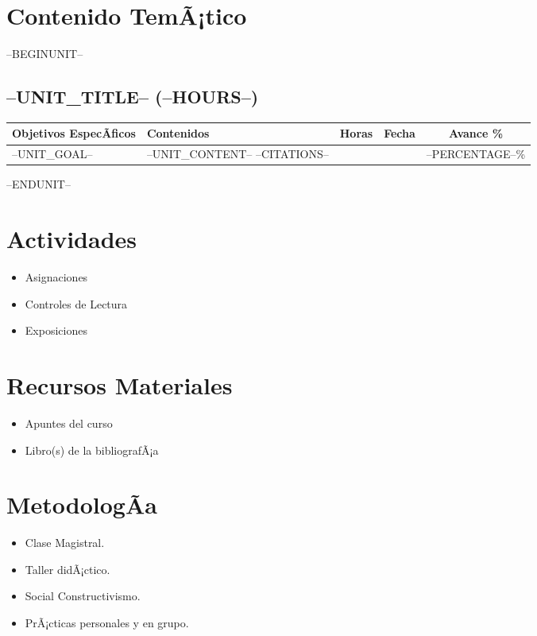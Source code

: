 \documentclass[a4paper]{article}
\begin{document}
\section{Contenido TemÃ¡tico}
--BEGINUNIT--
\subsection{--UNIT_TITLE-- (--HOURS--)}
\begin{tabularx}{\textwidth}{|X|X|c|c|c|} \hline
\textbf{Objetivos EspecÃ­ficos} &   \textbf{Contenidos} & \textbf{Horas} & \textbf{Fecha} & \textbf{Avance \%}  \\ \hline
--UNIT_GOAL--      & 
--UNIT_CONTENT--
--CITATIONS-- &
&
&
--PERCENTAGE--\% \\ \hline
\end{tabularx}

--ENDUNIT--


\section{Actividades}
\begin{itemize}
\item Asignaciones
\item Controles de Lectura
\item Exposiciones
\end{itemize} 

\section{Recursos Materiales}
\begin{itemize}
\item Apuntes del curso
\item Libro(s) de la bibliografÃ¡a
\end{itemize} 

\section{MetodologÃ­a}
\begin{itemize}
\item Clase Magistral.
\item Taller didÃ¡ctico.
\item Social Constructivismo.
\item PrÃ¡cticas personales y en grupo.
\end{itemize} 
\end{document}
